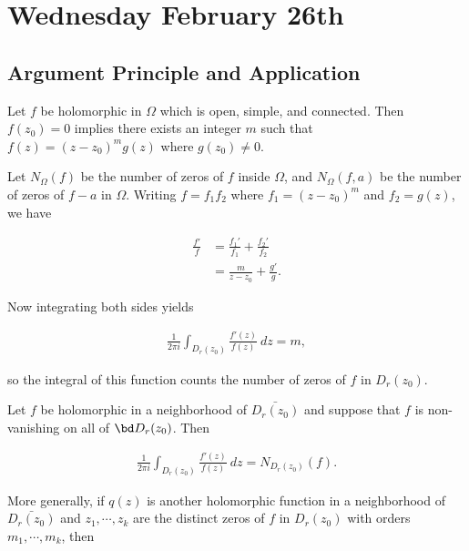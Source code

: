 \hypertarget{wednesday-february-26th}{%
\section{Wednesday February 26th}\label{wednesday-february-26th}}

\hypertarget{argument-principle-and-application}{%
\subsection{Argument Principle and
Application}\label{argument-principle-and-application}}

Let \(f\) be holomorphic in \(\Omega\) which is open, simple, and
connected. Then \(f(z_0) = 0\) implies there exists an integer \(m\)
such that \(f(z) = (z-z_0)^m g(z)\) where \(g(z_0) \neq 0\).

Let \(N_\Omega(f)\) be the number of zeros of \(f\) inside \(\Omega\),
and \(N_\Omega(f, a)\) be the number of zeros of \(f-a\) in \(\Omega\).
Writing \(f = f_1 f_2\) where \(f_1 = (z-z_0)^m\) and \(f_2 = g(z)\), we
have

\begin{align*}
\frac {f'} f
&= \frac {f_1'} {f_1} + \frac {f_2'} {f_2} \\
&= \frac m {z-z_0} + \frac {g'} g
.\end{align*}

Now integrating both sides yields

\begin{align*}
\frac 1 {2\pi i } \int_{D_r(z_0)} \frac{f'(z)}{f(z)} ~dz = m
,\end{align*}

so the integral of this function counts the number of zeros of \(f\) in
\(D_r(z_0)\).

\begin{description}
\tightlist
\item[Proposition (Argument Principle)]
Let \(f\) be holomorphic in a neighborhood of \(\bar{D_r(z_0)}\) and
suppose that \(f\) is non-vanishing on all of \(\bd D_r(z_0)\). Then
\end{description}

\begin{align*}
  \frac 1 {2\pi i } \int_{D_r(z_0)} \frac{f'(z)}{f(z)} ~dz = N_{D_r(z_0)}(f)
  .\end{align*}

More generally, if \(q(z)\) is another holomorphic function in a
neighborhood of \(\bar{D_r(z_0)}\) and \(z_1, \cdots, z_k\) are the
distinct zeros of \(f\) in \(D_r(z_0)\) with orders
\(m_1, \cdots, m_k\), then

